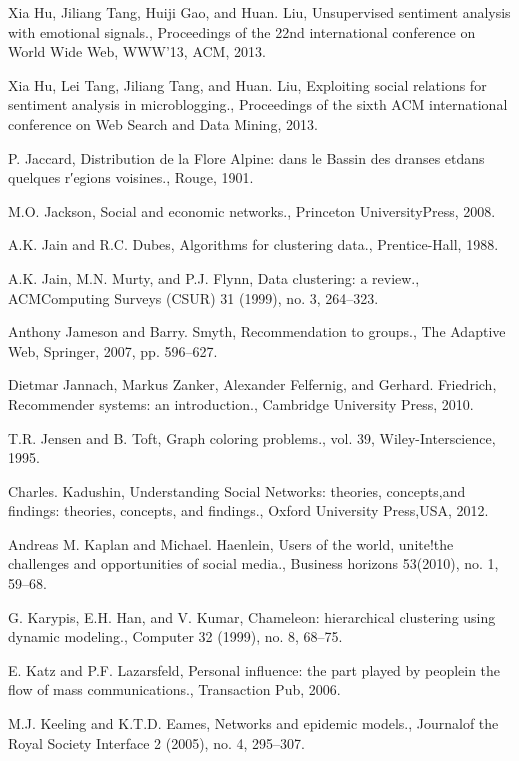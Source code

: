 \begin{thebibliography}{999}
 Xia Hu, Jiliang Tang, Huiji Gao, and Huan. Liu, Unsupervised sentiment analysis with emotional signals., Proceedings of the 22nd international conference on World Wide Web, WWW’13, ACM, 2013.

 Xia Hu, Lei Tang, Jiliang Tang, and Huan. Liu, Exploiting social relations for sentiment analysis in microblogging., Proceedings of the sixth ACM international conference on Web Search and Data Mining, 2013.

 P. Jaccard, Distribution de la Flore Alpine: dans le Bassin des dranses etdans quelques r′egions voisines., Rouge, 1901.

 M.O. Jackson, Social and economic networks., Princeton UniversityPress, 2008.

 A.K. Jain and R.C. Dubes, Algorithms for clustering data., Prentice-Hall, 1988.

 A.K. Jain, M.N. Murty, and P.J. Flynn, Data clustering: a review., ACMComputing Surveys (CSUR) 31 (1999), no. 3, 264–323.

 Anthony Jameson and Barry. Smyth, Recommendation to groups., The Adaptive Web, Springer, 2007, pp. 596–627.

 Dietmar Jannach, Markus Zanker, Alexander Felfernig, and Gerhard. Friedrich, Recommender systems: an introduction., Cambridge University Press, 2010.

 T.R. Jensen and B. Toft, Graph coloring problems., vol. 39, Wiley-Interscience, 1995.

 Charles. Kadushin, Understanding Social Networks: theories, concepts,and findings: theories, concepts, and findings., Oxford University Press,USA, 2012.

 Andreas M. Kaplan and Michael. Haenlein, Users of the world, unite!the challenges and opportunities of social media., Business horizons 53(2010), no. 1, 59–68.

 G. Karypis, E.H. Han, and V. Kumar, Chameleon: hierarchical clustering using dynamic modeling., Computer 32 (1999), no. 8, 68–75.

 E. Katz and P.F. Lazarsfeld, Personal influence: the part played by peoplein the flow of mass communications., Transaction Pub, 2006.

 M.J. Keeling and K.T.D. Eames, Networks and epidemic models., Journalof the Royal Society Interface 2 (2005), no. 4, 295–307.


\end{thebibliography}
